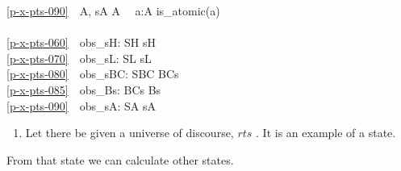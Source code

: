 \ref{p-x-pts-090}\ \ A, sA {\EQ} A\ \  {\ALL} a:A {\RDOT} is\_atomic(a)\\
\\
\ref{p-x-pts-060}\ \ obs\_sH: SH {\RIGHTARROW} sH \\
\ref{p-x-pts-070}\ \ obs\_sL: SL {\RIGHTARROW} sL\ \ \ \ \ \ \\
\ref{p-x-pts-080}\ \ obs\_sBC: SBC {\RIGHTARROW} BCs\ \ \ \\
\ref{p-x-pts-085}\ \ obs\_Bs: BCs {\RIGHTARROW} Bs\ \ \ \ \\
\ref{p-x-pts-090}\ \ obs\_sA: SA {\RIGHTARROW} sA \eox
\ep
\normalsize\rm


\pos{\vspace*{1.5mm}\smallish}{} \LLLL\HHHH

\begin{enumerate}\setei
\item \label{p-srares-000} Let there be given a universe of discourse,
                         $rts$ . It is an example of a state.
\savei\end{enumerate}
\noindent From that state we can calculate other states.

